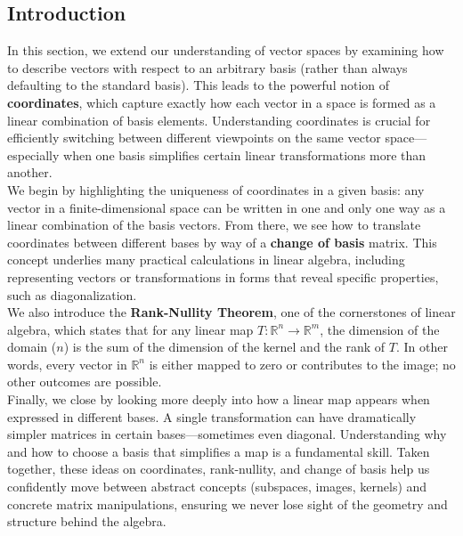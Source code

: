 \documentclass[a4paper, 9pt]{extarticle}
\begin{document}
\subsection*{Introduction}
\noindent In this section, we extend our understanding of vector spaces by examining how to describe vectors with respect to an arbitrary basis (rather than always defaulting to the standard basis). This leads to the powerful notion of \textbf{coordinates}, which capture exactly how each vector in a space is formed as a linear combination of basis elements. Understanding coordinates is crucial for efficiently switching between different viewpoints on the same vector space—especially when one basis simplifies certain linear transformations more than another. \\[2ex]
\noindent We begin by highlighting the uniqueness of coordinates in a given basis: any vector in a finite-dimensional space can be written in one and only one way as a linear combination of the basis vectors. From there, we see how to translate coordinates between different bases by way of a \textbf{change of basis} matrix. This concept underlies many practical calculations in linear algebra, including representing vectors or transformations in forms that reveal specific properties, such as diagonalization. \\[2ex]
\noindent We also introduce the \textbf{Rank-Nullity Theorem}, one of the cornerstones of linear algebra, which states that for any linear map $T:\mathbb{R}^n \to \mathbb{R}^m$, the dimension of the domain ($n$) is the sum of the dimension of the kernel and the rank of $T$. In other words, every vector in $\mathbb{R}^n$ is either mapped to zero or contributes to the image; no other outcomes are possible. \\[2ex]
\noindent Finally, we close by looking more deeply into how a linear map appears when expressed in different bases. A single transformation can have dramatically simpler matrices in certain bases—sometimes even diagonal. Understanding why and how to choose a basis that simplifies a map is a fundamental skill. Taken together, these ideas on coordinates, rank-nullity, and change of basis help us confidently move between abstract concepts (subspaces, images, kernels) and concrete matrix manipulations, ensuring we never lose sight of the geometry and structure behind the algebra.
\end{document}

